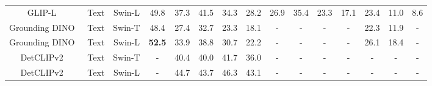 \begin{table}[t]
{\begin{tabular}{ccc|c|cccccccc|cc|c}
      GLIP-L~\cite{li2022grounded}                  & Text                                                                    & Swin-L                    & 49.8                                                         & 37.3          & 41.5          & 34.3          & \multicolumn{1}{c|}{28.2}          & 26.9          & 35.4          & 23.3          & 17.1          & 23.4                                   & 11.0                                  & 8.6                                                             \\
      Grounding DINO~\cite{liu2023grounding}          & Text                                                                    & Swin-T                    & 48.4                                                         & 27.4          & 32.7          & 23.3          & \multicolumn{1}{c|}{18.1}          & -             & -             & -             & -             & 22.3                                   & 11.9                                  & -                                                               \\
      Grounding DINO~\cite{liu2023grounding}          & Text                                                                    & Swin-L                    & \textbf{52.5}                                                & 33.9          & 38.8          & 30.7          & \multicolumn{1}{c|}{22.2}          & -             & -             & -             & -             & 26.1                                   & 18.4                                  & -                                                               \\
      DetCLIPv2~\cite{yao2023detclipv2}               & Text                                                                    & Swin-T                    & -                                                            & 40.4          & 40.0          & 41.7          & \multicolumn{1}{c|}{36.0}          & -             & -             & -             & -             & -                                      & -                                     & -                                                               \\
      DetCLIPv2~\cite{yao2023detclipv2}               & Text                                                                    & Swin-L                    & -                                                            & 44.7          & 43.7          & 46.3          & \multicolumn{1}{c|}{43.1}          & -             & -             & -             & -             & -                                      & -                                     & -                                                               \\

\end{tabular}}
\end{table}
